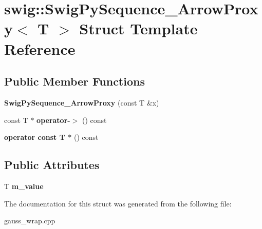 \hypertarget{structswig_1_1_swig_py_sequence___arrow_proxy}{\section{swig\-:\-:Swig\-Py\-Sequence\-\_\-\-Arrow\-Proxy$<$ T $>$ Struct Template Reference}
\label{structswig_1_1_swig_py_sequence___arrow_proxy}
}
\subsection*{Public Member Functions}
\begin{DoxyCompactItemize}
\item 
\hypertarget{structswig_1_1_swig_py_sequence___arrow_proxy_a28b1117f7ac65b3ec51101215306a9d9}{{\bfseries Swig\-Py\-Sequence\-\_\-\-Arrow\-Proxy} (const T \&x)}\label{structswig_1_1_swig_py_sequence___arrow_proxy_a28b1117f7ac65b3ec51101215306a9d9}

\item 
\hypertarget{structswig_1_1_swig_py_sequence___arrow_proxy_a035427f35fdd8d16e83402a18d43998f}{const T $\ast$ {\bfseries operator-\/$>$} () const }\label{structswig_1_1_swig_py_sequence___arrow_proxy_a035427f35fdd8d16e83402a18d43998f}

\item 
\hypertarget{structswig_1_1_swig_py_sequence___arrow_proxy_a76baddd748c4aa53d751408f4fabd05b}{{\bfseries operator const T $\ast$} () const }\label{structswig_1_1_swig_py_sequence___arrow_proxy_a76baddd748c4aa53d751408f4fabd05b}

\end{DoxyCompactItemize}
\subsection*{Public Attributes}
\begin{DoxyCompactItemize}
\item 
\hypertarget{structswig_1_1_swig_py_sequence___arrow_proxy_a7e68416553925e7556e737325c324e0f}{T {\bfseries m\-\_\-value}}\label{structswig_1_1_swig_py_sequence___arrow_proxy_a7e68416553925e7556e737325c324e0f}

\end{DoxyCompactItemize}


The documentation for this struct was generated from the following file\-:\begin{DoxyCompactItemize}
\item 
gauss\-\_\-wrap.\-cpp\end{DoxyCompactItemize}
